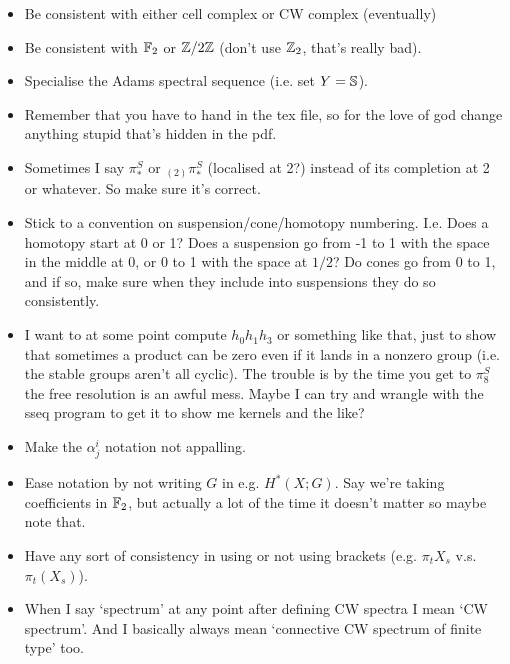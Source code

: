 \documentclass{MetricNotes2023}
\def\bb{\ensuremath\mathbb}
\def\inte{\ensuremath\mathbb{Z}}
\begin{document}
\begin{itemize}
\item Be consistent with either cell complex or CW complex (eventually)

\item Be consistent with \(\bb{F}_2\)  or \(\inte/2\inte\) (don't use \(\inte_2\), that's really bad).

\item Specialise the Adams spectral sequence (i.e. set \(Y=\bb{S}\)).

\item Remember that you have to hand in the tex file, so for the love of god change anything stupid that's hidden in the pdf.

\item Sometimes I say \(\pi_*^S\) or \(\text{}_{(2)}\pi_*^S\) (localised at 2?) instead of its completion at 2 or whatever. So make sure it's correct.

\item Stick to a convention on suspension/cone/homotopy numbering. I.e. Does a homotopy start at 0 or 1? Does a suspension go from -1 to 1 with the space in the middle at 0, or 0 to 1 with the space at \(1/2\)? Do cones go from 0 to 1, and if so, make sure when they include into suspensions they do so consistently. 

\item I want to at some point compute \(h_0h_1h_3\) or something like that, just to show that sometimes a product can be zero even if it lands in a nonzero group (i.e. the stable groups aren't all cyclic). The trouble is by the time you get to \(\pi_8^S\) the free resolution is an awful mess. Maybe I can try and wrangle with the sseq program to get it to show me kernels and the like?

\item Make the \(\alpha^i_j\) notation not appalling.

\item Ease notation by not writing \(G\) in e.g. \(H^*(X;G)\). Say we're taking coefficients in \(\bb{F}_2\), but actually a lot of the time it doesn't matter so maybe note that.

\item Have any sort of consistency in using or not using brackets (e.g. \(\pi_t X_s\) v.s. \(\pi_t(X_s)\)). 

\item When I say `spectrum' at any point after defining CW spectra I mean `CW spectrum'. And I basically always mean `connective CW spectrum of finite type' too. 

\end{itemize}
\end{document}
